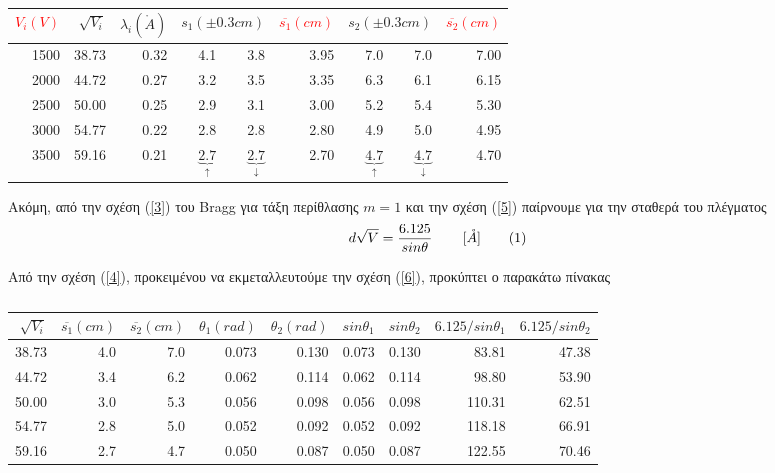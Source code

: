 \documentclass[a4paper]{article}
\newcommand\numberthis{\addtocounter{equation}{1}\tag{\theequation}}
\begin{document}
\begin{table}[h!]
\centering
\caption{ }
\begin{tabular}{r|r|r|r|r|r|r|r|r}
\textcolor{red}{$V_i( V)$} & $\sqrt{V_i}$ & $\lambda_i(\mathring{A})$ & \multicolumn{2}{r|}{$s_1(\pm0.3cm)$} & 							\textcolor{red}{$\overline{s_1}(cm)$}&\multicolumn{2}{r|}{$s_2(\pm0.3cm)$} & \textcolor{red}{$\overline{s_2}(cm)$} \\
\hline\hline 

1500&38.73&0.32&4.1&3.8&3.95&7.0&7.0&7.00\\
2000&44.72&0.27&3.2&3.5&3.35&6.3&6.1&6.15\\
2500&50.00&0.25&2.9&3.1&3.00&5.2&5.4&5.30\\
3000&54.77&0.22&2.8&2.8&2.80&4.9&5.0&4.95\\
3500&59.16&0.21&$\underbrace{2.7}_{\uparrow}$&$\underbrace{2.7}_{\downarrow}$&2.70&$\underbrace{4.7}_{\uparrow}$&$\underbrace{4.7}_{\downarrow}$ &4.70
\end{tabular}
\end{table}
Ακόμη, από την σχέση (\ref{3}) του Bragg για τάξη περίθλασης $m=1$ και την σχέση (\ref{5}) παίρνουμε για την σταθερά του πλέγματος
\begin{align*}\label{6}
d \sqrt{V}= \frac{6.125}{sin\theta}  \hspace{0.3in} [\mathring{A}] \numberthis
\end{align*} 

Από την σχέση (\ref{4}), προκειμένου να εκμεταλλευτούμε την σχέση (\ref{6}), προκύπτει ο παρακάτω πίνακας
\begin{table}[h!] 
\centering
\caption{ }
\begin{tabular}{r|r|r|r|r|r|r|r|r}
$\sqrt{V_i}$ & $\overline{s_1}(cm)$&$\overline{s_2}(cm)$&$\theta_1(rad)$&$\theta_2(rad)$&$sin\theta_1$&$sin\theta_2$&$6.125/sin\theta_1$&$6.125/sin\theta_2$ \\
\hline\hline
38.73&4.0&7.0&0.073&0.130&0.073&0.130&83.81&47.38\\
44.72&3.4&6.2&0.062&0.114&0.062&0.114&98.80&53.90\\
50.00&3.0&5.3&0.056&0.098&0.056&0.098&110.31&62.51\\
54.77&2.8&5.0&0.052&0.092&0.052&0.092&118.18&66.91\\
59.16&2.7&4.7&0.050&0.087&0.050&0.087&122.55&70.46\\
\end{tabular}
\end{table}
\end{document}
